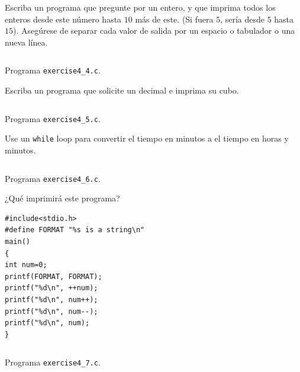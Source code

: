 \documentclass[spanish,addpoints,answers,a4paper]{exam}
\begin{document}
\begin{questions}
\question Escriba un programa que pregunte por un entero, y que imprima todos los enteros desde este número hasta $10$ más de este. (Si fuera $5$, sería desde $5$ hasta $15$). Asegúrese de separar cada valor de salida por un espacio o tabulador o una nueva línea.

\begin{solution}

\begin{listing}[H]
	\footnotesize
	\inputminted{c}{exercise4_4.c}
	\caption{Programa \texttt{exercise4\_4.c}.}
	\label{lst:4.4}
\end{listing}
\end{solution}

\question Escriba un programa que solicite un decimal e imprima su cubo.

\begin{solution}

\begin{listing}[H]
	\footnotesize
	\inputminted{c}{exercise4_5.c}
	\caption{Programa \texttt{exercise4\_5.c}.}
	\label{lst:4.5}
\end{listing}
\end{solution}

\question Use un \texttt{while} loop para convertir el tiempo en minutos a el tiempo en horas y minutos.

\begin{solution}
	
\begin{listing}[H]
	\footnotesize
	\inputminted{c}{exercise4_6.c}
	\caption{Programa \texttt{exercise4\_6.c}.}
	\label{lst:4.6}
\end{listing}
\end{solution}

\question ¿Qué imprimirá este programa?

\begin{verbatim}
#include<stdio.h>
#define FORMAT "%s is a string\n"
main()
{
int num=0;
printf(FORMAT, FORMAT);
printf("%d\n", ++num);
printf("%d\n", num++);
printf("%d\n", num--);
printf("%d\n", num);
}
\end{verbatim}

\begin{solution}

\begin{listing}[H]
	\footnotesize
	\inputminted{c}{exercise4_7.c}
	\caption{Programa \texttt{exercise4\_7.c}.}
	\label{lst:4.7}
\end{listing}



\end{solution}
\end{questions}
\end{document}
